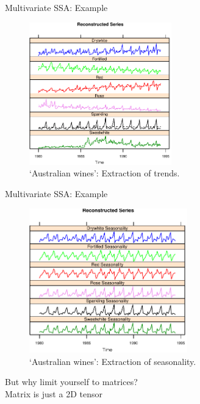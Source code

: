 \documentclass[pdf, unicode, ucs, notheorems]{beamer}
\theoremstyle{definition}
\begin{document}
\begin{frame}{Multivariate SSA: Example}
  \begin{figure}
    \centering
    \includegraphics[width=0.55\textwidth]{wine_trends}
    \caption{`Australian wines': Extraction of trends.}
  \end{figure}
\end{frame}

\begin{frame}{Multivariate SSA: Example}
  \begin{figure}
    \centering
    \includegraphics[width=0.61\textwidth]{wine_seasonality}
    \caption{`Australian wines': Extraction of seasonality.}
  \end{figure}
\end{frame}

\begin{frame}
  \vfill{}
  \begin{center}
    \huge But why limit yourself to matrices?\\
    Matrix is just a 2D tensor
  \end{center}
  \vfill{}
\end{frame}
\end{document}
